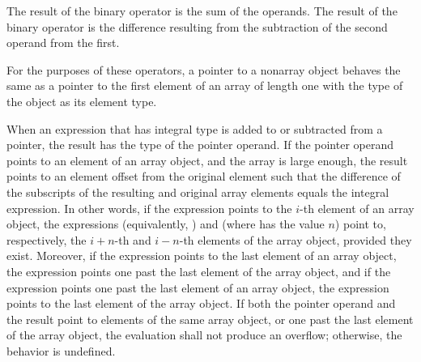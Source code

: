 \pnum
The result of the binary \tcode{+} operator is the sum of the operands.
The result of the binary \tcode{-} operator is the difference resulting
from the subtraction of the second operand from the first.

\pnum
{}%
For the purposes of these operators, a pointer to a nonarray object
behaves the same as a pointer to the first element of an array of length
one with the type of the object as its element type.

\pnum
When an expression that has integral type is added to or subtracted from
a pointer, the result has the type of the pointer operand. If the
pointer operand points to an element of an array object, and the array
is large enough, the result points to an element offset from the
original element such that the difference of the subscripts of the
resulting and original array elements equals the integral expression. In
other words, if the expression  points to the $i$-th element of
an array object, the expressions  (equivalently,
) and  (where  has the value $n$)
point to, respectively, the $i+n$-th and $i-n$-th elements of the array
object, provided they exist. Moreover, if the expression 
points to the last element of an array object, the expression
 points one past the last element of the array object, and
if the expression  points one past the last element of an array
object, the expression  points to the last element of the
array object. If both the pointer operand and the result point to
elements of the same array object, or one past the last element of the
array object, the evaluation shall not produce an overflow; otherwise,
the behavior is undefined.

